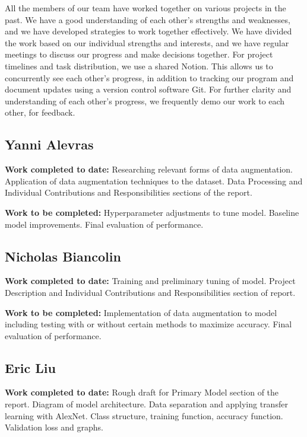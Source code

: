 \documentclass{article} %
\begin{document}
All the members of our team have worked together on various projects in the past. We have a good understanding of each other's strengths and weaknesses, and we have developed strategies to work together effectively. We have divided the work based on our individual strengths and interests, and we have regular meetings to discuss our progress and make decisions together. For project timelines and task distribution, we use a shared Notion. This allows us to concurrently see each other's progress, in addition to tracking our program and document updates using a version control software Git. For further clarity and understanding of each other's progress, we frequently demo our work to each other, for feedback.

\subsection{Yanni Alevras}
\label{subsec:yanni_alevras}

\textbf{Work completed to date:}
Researching relevant forms of data augmentation. Application of data augmentation techniques to the dataset. Data Processing and Individual Contributions and Responsibilities sections of the report. 

\textbf{Work to be completed:}
Hyperparameter adjustments to tune model. Baseline model improvements. Final evaluation of performance.

\subsection{Nicholas Biancolin}
\label{subsec:nicholas_biancolin}

\textbf{Work completed to date:}
Training and preliminary tuning of model. Project Description and Individual Contributions and Responsibilities section of report.

\textbf{Work to be completed:}
Implementation of data augmentation to model including testing with or without certain methods to maximize accuracy. Final evaluation of performance.

\subsection{Eric Liu}
\label{subsec:eric_liu}

\textbf{Work completed to date:}
Rough draft for Primary Model section of the report. Diagram of model architecture. Data separation and applying transfer learning with AlexNet. Class structure, training function, accuracy function. Validation loss and graphs.
\end{document}
